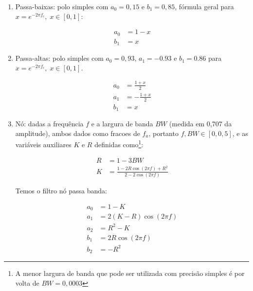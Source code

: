\begin{enumerate}
\item Passa-baixas: polo simples com $a_0=0,15$ e $b_1=0,85$, fórmula geral para $x=e^{-2\pi f_c},\; x \in [0,1]$:

\begin{equation}
\begin{split}
a_0 & =  1-x \\
b_1 & =  x
\end{split}
\end{equation}

\item Passa-altas: polo simples com $a_0=0,93$, $a_1=-0.93$ e $b_1=0.86$ para $x=e^{-2\pi f_c},\; x \in [0,1]$.

\begin{equation}
\begin{split}
a_0 & =  \frac{1+x}{2} \\
a_1 & =  -\frac{1+x}{2} \\
b_1 & =  x
\end{split}
\end{equation}


\item Nó: dadas a frequência $f$ e a largura de banda $BW$ (medida em 0,707 da amplitude),
ambos dados como fracoes de $f_a$, portanto $f,BW \in [0,0,5]$,
e as variáveis auxiliares $K$ e $R$ definidas como\footnote{A menor largura
de banda que pode ser utilizada com precisão simples é por volta de $BW=0,0003$}:

\begin{equation}
\begin{split}
R & = 1 - 3BW \\
K & = \frac{1-2R\cos(2\pi f) + R^2}{2 - 2 \cos (2 \pi f)}
\end{split}
\end{equation}

Temos o filtro nó passa banda:

\begin{equation}
\begin{split}
a_0 & =  1 - K \\
a_1 & =  2(K-R)\cos (2\pi f) \\
a_2 & =  R^2-K \\
b_1 & =  2R \cos (2\pi f) \\
b_2 & =  -R^2
\end{split}
\end{equation}


\end{enumerate}
